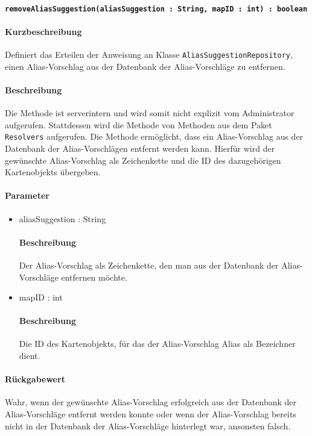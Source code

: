 \paragraph{\texttt{removeAliasSuggestion(aliasSuggestion : String, mapID : int) : boolean}}%
\paragraph*{Kurzbeschreibung}
Definiert das Erteilen der Anweisung an Klasse \texttt{AliasSuggestionRepository}, einen Alias-Vorschlag aus der Datenbank der Alias-Vorschläge zu entfernen.
\paragraph*{Beschreibung}
Die Methode ist serverintern und wird somit nicht explizit vom Administrator aufgerufen.
Stattdessen wird die Methode von Methoden aus dem Paket \texttt{Resolvers} aufgerufen.
Die Methode ermöglicht, dass ein Alias-Vorschlag aus der Datenbank der Alias-Vorschlägen entfernt werden kann.
Hierfür wird der gewünschte Alias-Vorschlag als Zeichenkette und die ID des dazugehörigen Kartenobjekts übergeben.
\paragraph*{Parameter}
\begin{itemize}
    \item aliasSuggestion : String
    		\paragraph*{Beschreibung}
    		Der Alias-Vorschlag als Zeichenkette, den man aus der Datenbank der Alias-Vorschläge entfernen möchte.
    \item mapID : int
    		\paragraph*{Beschreibung}
    		Die ID des Kartenobjekts, für das der Alias-Vorschlag Alias als Bezeichner dient.
\end{itemize}
\paragraph*{Rückgabewert}
Wahr, wenn der gewünschte Alias-Vorschlag erfolgreich aus der Datenbank der Alias-Vorschläge entfernt werden konnte oder wenn der Alias-Vorschlag bereits nicht in der Datenbank der Alias-Vorschläge hinterlegt war, ansonsten falsch.
